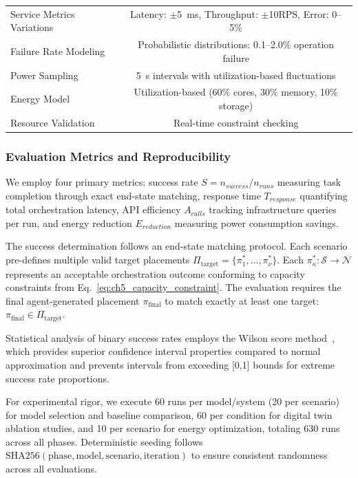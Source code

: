 {\begin{table}
\begin{tabular}{l|c|c|c}
        Service Metrics Variations & \multicolumn{3}{c}{Latency: $\pm$\SI{5}{\milli\second}, Throughput: $\pm$10RPS, Error: 0--5\%} \\
        \rowcolor{gray!20} Failure Rate Modeling & \multicolumn{3}{c}{Probabilistic distributions: 0.1--2.0\% operation failure} \\
        Power Sampling & \multicolumn{3}{c}{\SI{5}{\second} intervals with utilization-based fluctuations} \\
        \rowcolor{gray!20} Energy Model & \multicolumn{3}{c}{Utilization-based (60\% cores, 30\% memory, 10\% storage)} \\
        Resource Validation & \multicolumn{3}{c}{Real-time constraint checking} \\
        \bottomrule
    \end{tabular}
    

\end{table}

\subsubsection{Evaluation Metrics and Reproducibility}
\label{subsubsec:ch5_evaluation_metrics}

We employ four primary metrics: success rate $S = n_{success}/n_{runs}$ measuring task completion through exact end-state matching, response time $T_{response}$ quantifying total orchestration latency, \ac{API} efficiency $A_{calls}$ tracking infrastructure queries per run, and energy reduction $E_{reduction}$ measuring power consumption savings.

The success determination follows an end-state matching protocol. Each scenario pre-defines multiple valid target placements $\Pi_{\text{target}} = \{\pi_1^*, \ldots, \pi_\nu^*\}$. Each $\pi_\kappa^*: \mathcal{S} \to \mathcal{N}$ represents an acceptable orchestration outcome conforming to capacity constraints from Eq.~\ref{eq:ch5_capacity_constraint}. The evaluation requires the final agent-generated placement $\pi_{\text{final}}$ to match exactly at least one target: $\pi_{\text{final}} \in \Pi_{\text{target}}$. 

Statistical analysis of binary success rates employs the Wilson score method~\cite{wilson1927probable}, which provides superior confidence interval properties compared to normal approximation and prevents intervals from exceeding [0,1] bounds for extreme success rate proportions.

For experimental rigor, we execute 60 runs per model/system (20 per scenario) for model selection and baseline comparison, 60 per condition for digital twin ablation studies, and 10 per scenario for energy optimization, totaling 630 runs across all phases. Deterministic seeding follows $\text{SHA256}(\text{phase}, \text{model}, \text{scenario}, \text{iteration})$ to ensure consistent randomness across all evaluations. 

}
